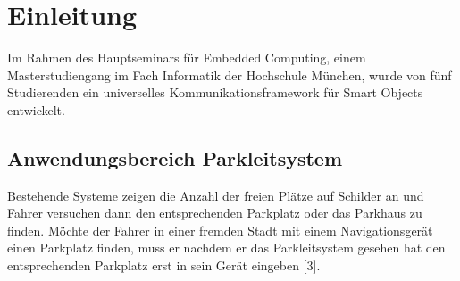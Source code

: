\section{Einleitung}

Im Rahmen des Hauptseminars für Embedded Computing, einem Masterstudiengang im Fach Informatik der Hochschule München, wurde von fünf Studierenden ein universelles Kommunikationsframework für Smart Objects entwickelt.
\cite{Akella2010}


\subsection{Anwendungsbereich Parkleitsystem}

Bestehende Systeme zeigen die Anzahl der freien Plätze auf Schilder an und Fahrer versuchen dann den entsprechenden Parkplatz oder das Parkhaus zu finden. Möchte der Fahrer in einer fremden Stadt mit einem Navigationsgerät einen Parkplatz finden, muss er nachdem er das Parkleitsystem gesehen hat den entsprechenden Parkplatz erst in sein Gerät eingeben [3].
